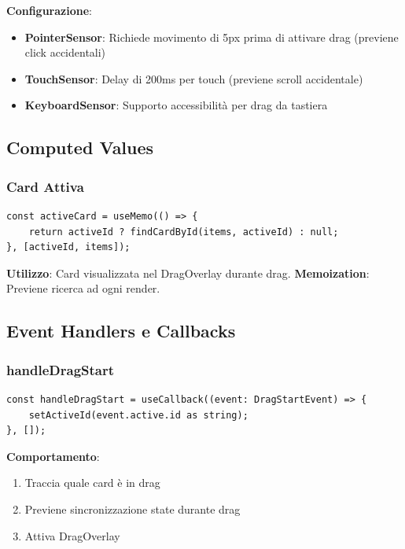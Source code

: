 \documentclass[11pt,a4paper]{article}
\begin{document}
\textbf{Configurazione}:
\begin{itemize}
    \item \textbf{PointerSensor}: Richiede movimento di 5px prima di attivare drag (previene click accidentali)
    \item \textbf{TouchSensor}: Delay di 200ms per touch (previene scroll accidentale)
    \item \textbf{KeyboardSensor}: Supporto accessibilità per drag da tastiera
\end{itemize}

\subsection{Computed Values}

\subsubsection{Card Attiva}

\begin{lstlisting}[style=typescript, caption=Card Attiva Computed]
const activeCard = useMemo(() => {
    return activeId ? findCardById(items, activeId) : null;
}, [activeId, items]);
\end{lstlisting}

\textbf{Utilizzo}: Card visualizzata nel DragOverlay durante drag. \textbf{Memoization}: Previene ricerca ad ogni render.

\subsection{Event Handlers e Callbacks}

\subsubsection{handleDragStart}

\begin{lstlisting}[style=typescript, caption=Handler Inizio Drag]
const handleDragStart = useCallback((event: DragStartEvent) => {
    setActiveId(event.active.id as string);
}, []);
\end{lstlisting}

\textbf{Comportamento}: 
\begin{enumerate}
    \item Traccia quale card è in drag
    \item Previene sincronizzazione state durante drag
    \item Attiva DragOverlay
\end{enumerate}
\end{document}
